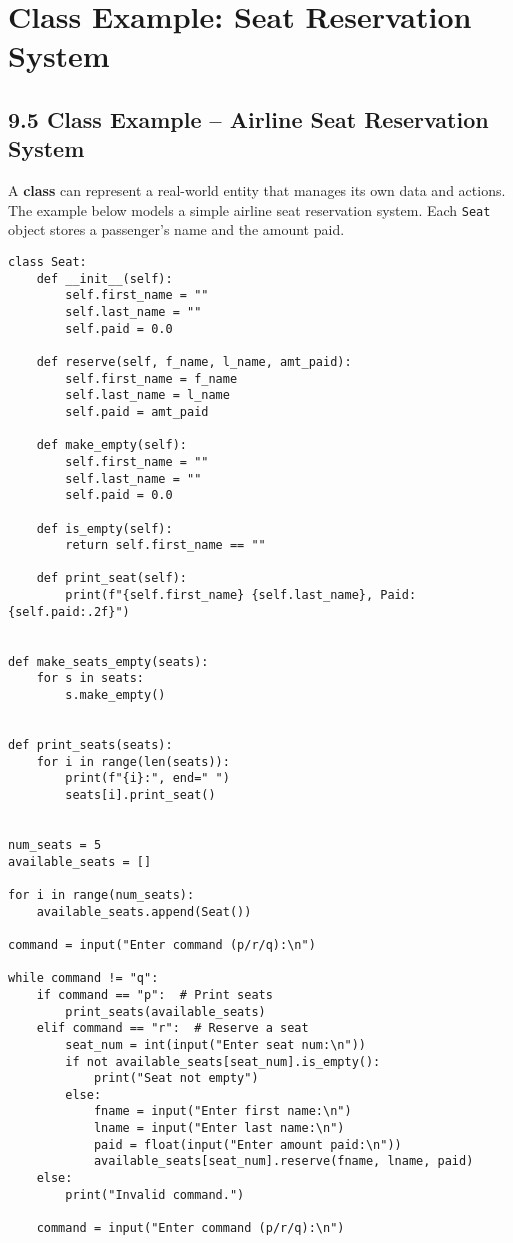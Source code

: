 \chapter{Class Example: Seat Reservation System}

\section*{9.5 Class Example – Airline Seat Reservation System}

A \textbf{class} can represent a real-world entity that manages its own data and actions.  
The example below models a simple airline seat reservation system. Each \texttt{Seat} object stores a passenger’s name and the amount paid.

\begin{verbatim}
class Seat:
    def __init__(self):
        self.first_name = ""
        self.last_name = ""
        self.paid = 0.0

    def reserve(self, f_name, l_name, amt_paid):
        self.first_name = f_name
        self.last_name = l_name
        self.paid = amt_paid

    def make_empty(self):
        self.first_name = ""
        self.last_name = ""
        self.paid = 0.0

    def is_empty(self):
        return self.first_name == ""

    def print_seat(self):
        print(f"{self.first_name} {self.last_name}, Paid: {self.paid:.2f}")


def make_seats_empty(seats):
    for s in seats:
        s.make_empty()


def print_seats(seats):
    for i in range(len(seats)):
        print(f"{i}:", end=" ")
        seats[i].print_seat()


num_seats = 5
available_seats = []

for i in range(num_seats):
    available_seats.append(Seat())

command = input("Enter command (p/r/q):\n")

while command != "q":
    if command == "p":  # Print seats
        print_seats(available_seats)
    elif command == "r":  # Reserve a seat
        seat_num = int(input("Enter seat num:\n"))
        if not available_seats[seat_num].is_empty():
            print("Seat not empty")
        else:
            fname = input("Enter first name:\n")
            lname = input("Enter last name:\n")
            paid = float(input("Enter amount paid:\n"))
            available_seats[seat_num].reserve(fname, lname, paid)
    else:
        print("Invalid command.")

    command = input("Enter command (p/r/q):\n")
\end{verbatim}

